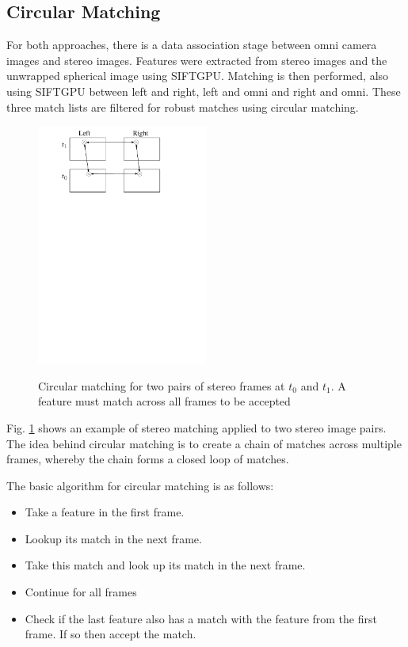 \subsection{Circular Matching}


For both approaches, there is a data association stage between omni camera images and stereo images.  Features were extracted from stereo images and the unwrapped spherical image using SIFTGPU.  Matching is then performed, also using SIFTGPU between left and right, left and omni and right and omni.  These three match lists are filtered for robust matches using circular matching. 

\begin{figure}[h]
  \centering
    \includegraphics[width=0.5\textwidth]{chapters/images/stereo_circular_matching}\\
  \caption{Circular matching for two pairs of stereo frames at $t_0$ and $t_1$. A feature must match across all frames to be accepted}
  \label{fig:stereo_circular_matching}
\end{figure}

Fig. \ref{fig:stereo_circular_matching} shows an example of stereo matching applied to two stereo image pairs.  The idea behind circular matching is to create a chain of matches across multiple frames, whereby the chain forms a closed loop of matches. 

The basic algorithm for circular matching is as follows:  
\begin{itemize} \itemsep1pt  \parskip0pt 
 \item Take a feature in the first frame.  
 \item Lookup its match in the next frame.  
 \item Take this match and look up its match in the next frame.  
 \item Continue for all frames
 \item Check if the last feature also has a match with the feature from the first frame.  
 \subitem If so then accept the match.
\end{itemize}

